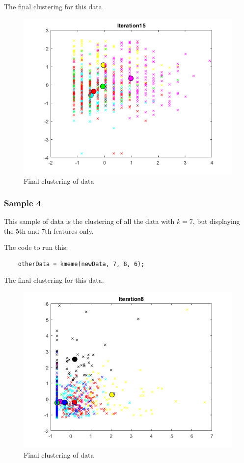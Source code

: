 \documentclass[12pt]{article}
\begin{document}
The final clustering for this data.
\begin{figure}[h!]
    \begin{center}
        \includegraphics[scale=1.2]{TQ3_3.png}
        \caption{Final clustering of data}
    \end{center}    
\end{figure}

\newpage

\subsubsection{Sample 4}
This sample of data is the clustering of all the data with $k=7$, but displaying the 5th and 7th features only.

\noindent
The code to run this:

\begin{verbatim}
    otherData = kmeme(newData, 7, 8, 6);
\end{verbatim}

The final clustering for this data.
\begin{figure}[h!]
    \begin{center}
        \includegraphics[scale=1.2]{TQ3_4.png}
        \caption{Final clustering of data}
    \end{center}    
\end{figure}
\end{document}
